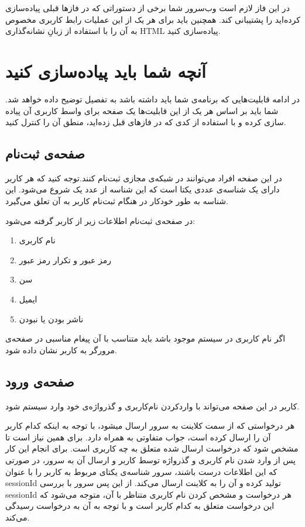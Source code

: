 \documentclass{utap}
\begin{document}
		در این فاز لازم است وب‌سرور شما برخی از دستوراتی که در فازها قبلی پیادەسازی کردەاید را پشتیبانی کند. همچنین باید برای هر یک از این عملیات رابط کاربری مخصوص به آن را با استفاده از زبانِ نشانه‌گذاری HTML پیادەسازی کنید.
		



	\section{آنچه‌ شما باید پیاده‌سازی کنید}
	
در ادامه قابلیت‌هایی که برنامه‌ی شما باید داشته باشد به تفصیل توضیح داده خواهد شد. شما باید بر اساس هر یک از این قابلیت‌ها یک صفحه برای واسط کاربری آن پیاده سازی کرده و با استفاده از کدی که در فازهای قبل زدەاید، منطق آن را کنترل کنید.
	
	\subsection{صفحه‌ی ثبت‌نام}
	
	در این صفحه افراد می‌توانند در شبکه‌ی مجازی ثبت‌نام کنند.توجه کنید که هر کاربر دارای یک شناسه‌ی عددی یکتا است که این شناسه از عدد یک شروع می‌شود. این شناسه به طور خودکار در هنگام
ثبت‌نام کاربر به آن تعلق می‌گیرد.  
	
	در صفحه‌ی ثبت‌نام اطلاعات زیر از کاربر گرفته می‌شود‌:‌
	\begin{enumerate}
		\item نام ‌کاربری
		\item رمز عبور و تکرار رمز عبور
		\item سن
		\item ایمیل
		\item ناشر بودن یا نبودن
	\end{enumerate}
	
	اگر نام کاربری در سیستم موجود باشد باید متناسب با آن پیغام مناسبی در صفحه‌ی مرورگر به کاربر نشان داده شود.
	
		
	\subsection{صفحه‌ی ورود}
	کاربر در این صفحه می‌تواند با واردکردن نام‌کاربری و گذرواژەی خود وارد سیستم شود. 
	
	هر درخواستی که از سمت کلاینت به سرور ارسال میشود، با توجه به اینکه کدام کاربر آن را ارسال کرده است، جواب متفاوتی به همراه دارد. برای همین نیاز است تا مشخص شود که درخواست ارسال شده متعلق به چه کاربری است. برای انجام این کار پس از وارد شدن نام‌ کاربری و گذرواژه توسط کاربر و ارسال آن به سرور، در صورتی که این اطلاعات درست باشند، سرور شناسه‌ی یکتای مربوط به کاربر را با عنوان sessionId تولید کرده و آن را به کلاینت ارسال می‌کند. از این پس سرور با بررسی sessionId هر درخواست و مشخص کردن نام کاربری متناظر با آن، متوجه می‌شود که این درخواست متعلق به کدام کاربر است و با توجه به آن به درخواست رسیدگی می‌کند.
	
\end{document}
